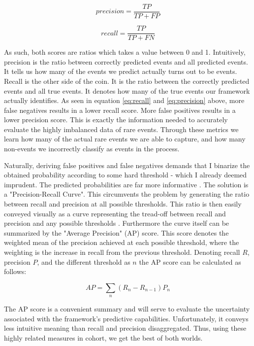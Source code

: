 \documentclass[a4paper]{article}
\begin{document}
\[
precision = \frac{TP}{TP+FP} \tag{2} \label{eq:recall}
\]

\[
recall = \frac{TP}{TP+FN} \tag{3} \label{eq:precision}
\]

As such, both scores are ratios which takes a value between 0 and 1. Intuitively, precision is the ratio between correctly predicted events and all predicted events. It tells us how many of the events we predict actually turns out to be events. Recall is the other side of the coin. It is the ratio between the correctly predicted events and all true events. It denotes how many of the true events our framework actually identifies. As seen in equation \ref{eq:recall} and \ref{eq:precision} above, more false negatives results in a lower recall score. More false positives results in a lower precision score. This is exactly the information needed to accurately evaluate the highly imbalanced data of rare events. Through these metrics we learn how many of the actual rare events we are able to capture, and how many non-events we incorrectly classify as events in the process.\par 

Naturally, deriving false positives and false negatives demands that I binarize the obtained probability according to some hard threshold - which I already deemed imprudent. The predicted probabilities are far more informative \citep{Goldstone_2010}. The solution is a "Precision-Recall Curve". This circumvents the problem by generating the ratio between recall and precision at all possible thresholds. This ratio is then easily conveyed visually as a curve representing the tread-off between recall and precision and any possible thresholds \cite[1278]{He_2008}. Furthermore the curve itself can be summarized by the "Average Precision" (AP) score. This score denotes the weighted mean of the precision achieved at each possible threshold, where the weighting is the increase in recall from the previous threshold. Denoting recall $R$, precision $P$, and the different threshold as $n$ the AP score can be calculated as follows:\par

\[
AP = \sum_n (R_n-R_{n-1})P_n \tag{4} \label{eq:ap}
\]

The AP score is a convenient summary and will serve to evaluate the uncertainty associated with the framework's predictive capabilities. Unfortunately, it conveys less intuitive meaning than recall and precision disaggregated. Thus, using these highly related measures in cohort, we get the best of both worlds.\par
\end{document}
